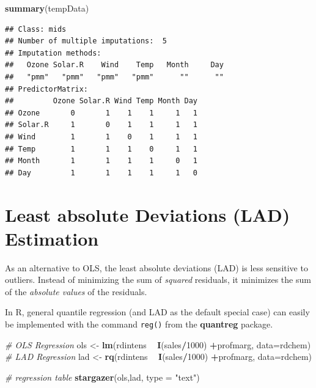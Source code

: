 \documentclass[]{book}
\newenvironment{Shaded}{\begin{snugshade}}{\end{snugshade}}
\newcommand{\CommentTok}[1]{\textcolor[rgb]{0.56,0.35,0.01}{\textit{#1}}}
\newcommand{\DataTypeTok}[1]{\textcolor[rgb]{0.13,0.29,0.53}{#1}}
\newcommand{\DecValTok}[1]{\textcolor[rgb]{0.00,0.00,0.81}{#1}}
\newcommand{\KeywordTok}[1]{\textcolor[rgb]{0.13,0.29,0.53}{\textbf{#1}}}
\newcommand{\NormalTok}[1]{#1}
\newcommand{\OperatorTok}[1]{\textcolor[rgb]{0.81,0.36,0.00}{\textbf{#1}}}
\newcommand{\StringTok}[1]{\textcolor[rgb]{0.31,0.60,0.02}{#1}}
\begin{document}
\begin{Shaded}
\begin{Highlighting}[]
\KeywordTok{summary}\NormalTok{(tempData)}
\end{Highlighting}
\end{Shaded}

\begin{verbatim}
## Class: mids
## Number of multiple imputations:  5 
## Imputation methods:
##   Ozone Solar.R    Wind    Temp   Month     Day 
##   "pmm"   "pmm"   "pmm"   "pmm"      ""      "" 
## PredictorMatrix:
##         Ozone Solar.R Wind Temp Month Day
## Ozone       0       1    1    1     1   1
## Solar.R     1       0    1    1     1   1
## Wind        1       1    0    1     1   1
## Temp        1       1    1    0     1   1
## Month       1       1    1    1     0   1
## Day         1       1    1    1     1   0
\end{verbatim}

\hypertarget{least-absolute-deviations-lad-estimation}{%
\section{Least absolute Deviations (LAD) Estimation}\label{least-absolute-deviations-lad-estimation}}

As an alternative to OLS, the least absolute deviations (LAD) is less sensitive to outliers. Instead of minimizing the sum of \emph{squared} residuals, it minimizes the sum of the \emph{absolute values} of the residuals.

In R, general quantile regression (and LAD as the default special case) can easily be implemented with the command \texttt{reg()} from the \textbf{quantreg} package.

\begin{Shaded}
\begin{Highlighting}[]
\CommentTok{# OLS Regression}
\NormalTok{ols <-}\StringTok{ }\KeywordTok{lm}\NormalTok{(rdintens }\OperatorTok{~}\StringTok{ }\KeywordTok{I}\NormalTok{(sales}\OperatorTok{/}\DecValTok{1000}\NormalTok{) }\OperatorTok{+}\NormalTok{profmarg, }\DataTypeTok{data=}\NormalTok{rdchem)}
\CommentTok{# LAD Regression}
\NormalTok{lad <-}\StringTok{ }\KeywordTok{rq}\NormalTok{(rdintens }\OperatorTok{~}\StringTok{ }\KeywordTok{I}\NormalTok{(sales}\OperatorTok{/}\DecValTok{1000}\NormalTok{) }\OperatorTok{+}\NormalTok{profmarg, }\DataTypeTok{data=}\NormalTok{rdchem)}

\CommentTok{# regression table}
\KeywordTok{stargazer}\NormalTok{(ols,lad,  }\DataTypeTok{type =} \StringTok{"text"}\NormalTok{)}
\end{Highlighting}
\end{Shaded}
\end{document}
